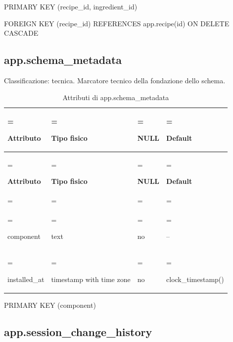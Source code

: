\documentclass[11pt,a4paper]{article}
\begin{document}
{\ttfamily\small PRIMARY KEY (\allowbreak{}recipe\_\allowbreak{}id,\allowbreak{} ingredient\_\allowbreak{}id)}\par

{\ttfamily\small FOREIGN KEY (\allowbreak{}recipe\_\allowbreak{}id) REFERENCES app.\allowbreak{}recipe(\allowbreak{}id) ON DELETE CASCADE}\par

\subsection{app.schema\_metadata}

Classificazione: tecnica. Marcatore tecnico della fondazione dello schema.

{\small \renewcommand{\arraystretch}{1.2}

\begin{xltabular}{\linewidth}{>{\hsize\linewidth=\hsize\raggedright\arraybackslash}X>{\hsize\linewidth=\hsize\raggedright\arraybackslash}X>{\hsize\linewidth=\hsize\raggedright\arraybackslash}X>{\hsize\linewidth=\hsize\raggedright\arraybackslash}X}
\caption{Attributi di app.schema\_metadata}\label{tab:dictionary-21}\\
\toprule

\textbf{Attributo} & \textbf{Tipo fisico} & \textbf{NULL} & \textbf{Default}\\\midrule\endfirsthead\toprule\textbf{Attributo} & \textbf{Tipo fisico} & \textbf{NULL} & \textbf{Default}\\\midrule\endhead
\midrule{}\\\endfoot\bottomrule\endlastfoot


{\ttfamily\small component} & {\ttfamily\small text} & no & {\ttfamily\small --}\\\addlinespace[3pt]

{\ttfamily\small installed\_\allowbreak{}at} & {\ttfamily\small timestamp with time zone} & no & {\ttfamily\small clock\_\allowbreak{}timestamp(\allowbreak{})}\\*

\end{xltabular}}

{\ttfamily\small PRIMARY KEY (\allowbreak{}component)}\par

\subsection{app.session\_change\_history}
\end{document}
